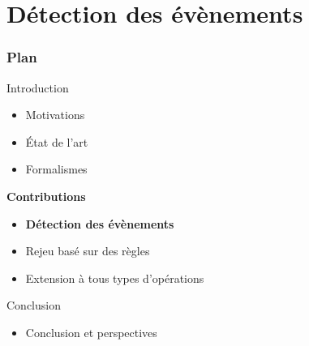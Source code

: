 \documentclass[aspectratio=1610]{beamer}
\begin{document}
\section[Évènements]{Détection des évènements}
\begin{frame}
	\frametitle{Plan}
	\centering
	\begin{minipage}{\textwidth}
		\raggedright
		\begin{minipage}{.55\textwidth}
			\begin{mytocblock}{Introduction}
				\begin{itemize}
					\item[] Motivations
					\item[] État de l'art
					\item[] Formalismes
				\end{itemize}
			\end{mytocblock}
		\end{minipage}

		\vspace{1em}

		\begin{minipage}{.55\textwidth}
			\begin{mytocblock}{\textbf{Contributions}}
				\begin{itemize}
					\item[] \textbf{Détection des évènements}
					\item[] Rejeu basé sur des règles
					\item[] Extension à tous types d'opérations
				\end{itemize}
			\end{mytocblock}
		\end{minipage}

		\vspace{1em}

		\begin{minipage}{.55\textwidth}
			\begin{mytocblock}{Conclusion}
				\begin{itemize}
					\item[] Conclusion et perspectives
				\end{itemize}
			\end{mytocblock}
		\end{minipage}
	\end{minipage}
\end{frame}

\end{document}
